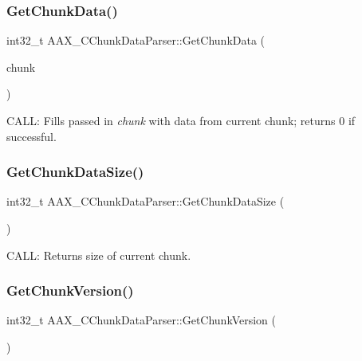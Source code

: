 \mbox{\label{a01461_a7cc4e0325d71d6957cdd10c1eaf5d8bc}} 
\subsubsection{\texorpdfstring{GetChunkData()}{GetChunkData()}}
{\footnotesize\ttfamily int32\+\_\+t A\+A\+X\+\_\+\+C\+Chunk\+Data\+Parser\+::\+Get\+Chunk\+Data (\begin{DoxyParamCaption}\item[{\mbox{\hyperlink{a01421}{A\+A\+X\+\_\+\+S\+Plug\+In\+Chunk}} $\ast$}]{chunk }\end{DoxyParamCaption})}



C\+A\+LL\+: Fills passed in {\itshape chunk} with data from current chunk; returns 0 if successful. 

\mbox{\label{a01461_ac113458fcdec81f316014ea4c3d73582}} 
\subsubsection{\texorpdfstring{GetChunkDataSize()}{GetChunkDataSize()}}
{\footnotesize\ttfamily int32\+\_\+t A\+A\+X\+\_\+\+C\+Chunk\+Data\+Parser\+::\+Get\+Chunk\+Data\+Size (\begin{DoxyParamCaption}{ }\end{DoxyParamCaption})}



C\+A\+LL\+: Returns size of current chunk. 

\mbox{\label{a01461_a8203d58398537e3d254b43f9d321af4c}} 
\subsubsection{\texorpdfstring{GetChunkVersion()}{GetChunkVersion()}}
{\footnotesize\ttfamily int32\+\_\+t A\+A\+X\+\_\+\+C\+Chunk\+Data\+Parser\+::\+Get\+Chunk\+Version (\begin{DoxyParamCaption}{ }\end{DoxyParamCaption})\hspace{0.3cm}{\ttfamily [inline]}}



